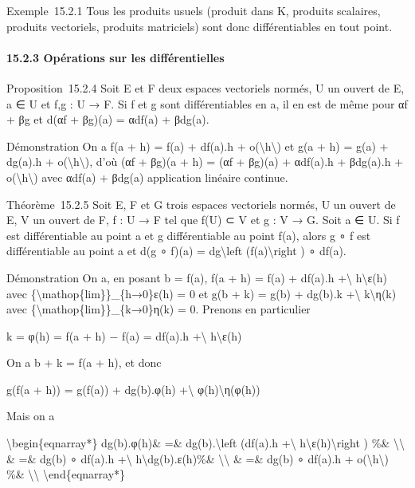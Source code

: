 \documentclass[]{article}
\begin{document}
Exemple~15.2.1 Tous les produits usuels (produit dans K, produits
scalaires, produits vectoriels, produits matriciels) sont donc
différentiables en tout point.

\paragraph{15.2.3 Opérations sur les différentielles}

Proposition~15.2.4 Soit E et F deux espaces vectoriels normés, U un
ouvert de E, a ∈ U et f,g : U → F. Si f et g sont différentiables en a,
il en est de même pour αf + βg et d(αf + βg)(a) = αdf(a) + βdg(a).

Démonstration On a f(a + h) = f(a) + df(a).h +
o(\textbackslash{}\textbar{}h\textbackslash{}\textbar{}) et g(a + h) =
g(a) + dg(a).h +
o(\textbackslash{}\textbar{}h\textbackslash{}\textbar{}), d'où (αf +
βg)(a + h) = (αf + βg)(a) + αdf(a).h + βdg(a).h +
o(\textbackslash{}\textbar{}h\textbackslash{}\textbar{}) avec αdf(a) +
βdg(a) application linéaire continue.

Théorème~15.2.5 Soit E, F et G trois espaces vectoriels normés, U un
ouvert de E, V un ouvert de F, f : U → F tel que f(U) ⊂ V et g : V → G.
Soit a ∈ U. Si f est différentiable au point a et g différentiable au
point f(a), alors g ∘ f est différentiable au point a et d(g ∘ f)(a) =
dg\textbackslash{}left (f(a)\textbackslash{}right ) ∘ df(a).

Démonstration On a, en posant b = f(a), f(a + h) = f(a) + df(a).h
+\textbackslash{}\textbar{} h\textbackslash{}\textbar{}ε(h) avec
\{\textbackslash{}mathop\{lim\}\}\_\{h→0\}ε(h) = 0 et g(b + k) = g(b) +
dg(b).k +\textbackslash{}\textbar{} k\textbackslash{}\textbar{}η(k) avec
\{\textbackslash{}mathop\{lim\}\}\_\{k→0\}η(k) = 0. Prenons en
particulier

k = φ(h) = f(a + h) − f(a) = df(a).h +\textbackslash{}\textbar{}
h\textbackslash{}\textbar{}ε(h)

On a b + k = f(a + h), et donc

g(f(a + h)) = g(f(a)) + dg(b).φ(h) +\textbackslash{}\textbar{}
φ(h)\textbackslash{}\textbar{}η(φ(h))

Mais on a

\textbackslash{}begin\{eqnarray*\} dg(b).φ(h)\& =\&
dg(b).\textbackslash{}left (df(a).h +\textbackslash{}\textbar{}
h\textbackslash{}\textbar{}ε(h)\textbackslash{}right ) \%\&
\textbackslash{}\textbackslash{} \& =\& dg(b) ∘ df(a).h
+\textbackslash{}\textbar{} h\textbackslash{}\textbar{}dg(b).ε(h)\%\&
\textbackslash{}\textbackslash{} \& =\& dg(b) ∘ df(a).h +
o(\textbackslash{}\textbar{}h\textbackslash{}\textbar{}) \%\&
\textbackslash{}\textbackslash{} \textbackslash{}end\{eqnarray*\}
\end{document}
